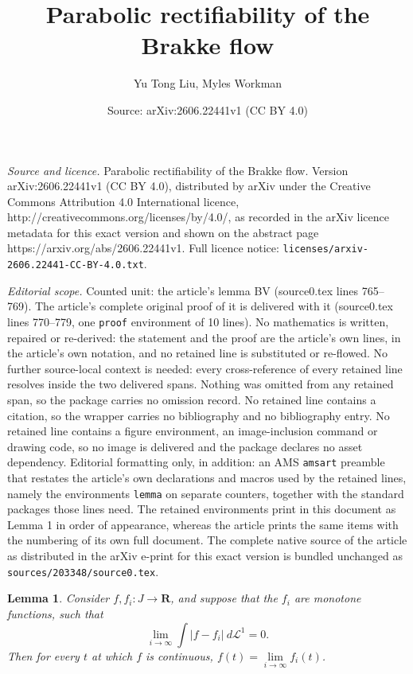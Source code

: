 \documentclass[10pt,a4paper]{amsart}
\title{Parabolic rectifiability of the Brakke flow}
\author{Yu Tong Liu, Myles Workman}
\date{Source: arXiv:2606.22441v1 (CC BY 4.0)}
\newtheorem{lemma}{Lemma}
\begin{document}
\maketitle

\noindent\emph{Source and licence.} Parabolic rectifiability of the Brakke flow. Version arXiv:2606.22441v1 (CC BY 4.0), distributed by arXiv under the Creative Commons Attribution 4.0 International licence, http://creativecommons.org/licenses/by/4.0/, as recorded in the arXiv licence metadata for this exact version and shown on the abstract page https://arxiv.org/abs/2606.22441v1. Full licence notice: \texttt{licenses/arxiv-2606.22441-CC-BY-4.0.txt}.\par\smallskip

\noindent\textit{Editorial scope.} Counted unit: the article's lemma BV (source0.tex lines 765--769). The article's complete original proof of it is delivered with it (source0.tex lines 770--779, one \texttt{proof} environment of 10 lines). No mathematics is written, repaired or re-derived: the statement and the proof are the article's own lines, in the article's own notation, and no retained line is substituted or re-flowed.  No further source-local context is needed: every cross-reference of every retained line resolves inside the two delivered spans.  Nothing was omitted from any retained span, so the package carries no omission record.  No retained line contains a citation, so the wrapper carries no bibliography and no bibliography entry.  No retained line contains a figure environment, an image-inclusion command or drawing code, so no image is delivered and the package declares no asset dependency.  Editorial formatting only, in addition: an AMS \texttt{amsart} preamble that restates the article's own declarations and macros used by the retained lines, namely the environments \texttt{lemma} on separate counters, together with the standard packages those lines need.  The retained environments print in this document as Lemma 1 in order of appearance, whereas the article prints the same items with the numbering of its own full document.  The complete native source of the article as distributed in the arXiv e-print for this exact version is bundled unchanged as \texttt{sources/203348/source0.tex}.
\begin{lemma}\label{convergence of monotone BV}
    Consider $f,f_i : J \to \mathbf R$, and suppose that the $f_{i}$ are monotone functions, such that
    \[\textstyle  \lim\limits_{i\to\infty}\int |f-f_i| \ d \mathscr L^1 = 0.\]
    Then for every  $t$ at which $f$ is continuous, $f(t) = \lim\limits_{i\to\infty}f_i(t)$. 
\end{lemma}
\end{document}

